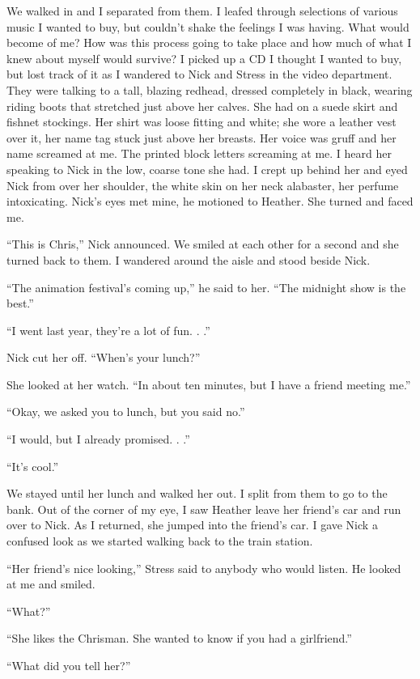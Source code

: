 We walked in and I separated from them. I leafed through selections of
various music I wanted to buy, but couldn't shake the feelings I was
having. What would become of me? How was this process going to take
place and how much of what I knew about myself would survive? I picked
up a CD I thought I wanted to buy, but lost track of it as I wandered to
Nick and Stress in the video department. They were talking to a tall,
blazing redhead, dressed completely in black, wearing riding boots that
stretched just above her calves. She had on a suede skirt and fishnet
stockings. Her shirt was loose fitting and white; she wore a leather
vest over it, her name tag stuck just above her breasts. Her voice was
gruff and her name screamed at me. The printed block letters screaming
at me. I heard her speaking to Nick in the low, coarse tone she had. I
crept up behind her and eyed Nick from over her shoulder, the white skin
on her neck alabaster, her perfume intoxicating. Nick's eyes met mine,
he motioned to Heather. She turned and faced me.

``This is Chris,'' Nick announced. We smiled at each other for a second
and she turned back to them. I wandered around the aisle and stood
beside Nick.

``The animation festival's coming up,'' he said to her. ``The midnight
show is the best.''

``I went last year, they're a lot of fun. . .''

Nick cut her off. ``When's your lunch?''

She looked at her watch. ``In about ten minutes, but I have a friend
meeting me.''

``Okay, we asked you to lunch, but you said no.''

``I would, but I already promised. . .''

``It's cool.''

We stayed until her lunch and walked her out. I split from them to go to
the bank. Out of the corner of my eye, I saw Heather leave her friend's
car and run over to Nick. As I returned, she jumped into the friend's
car. I gave Nick a confused look as we started walking back to the train
station.

``Her friend's nice looking,'' Stress said to anybody who would listen.
He looked at me and smiled.

``What?''

``She likes the Chrisman. She wanted to know if you had a girlfriend.''

``What did you tell her?''

